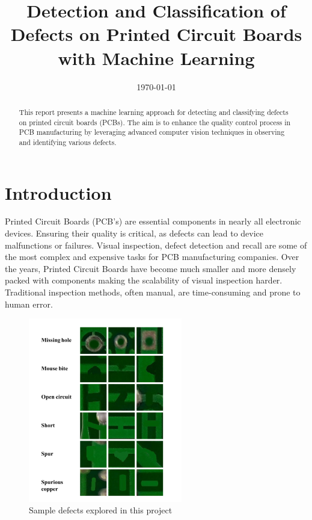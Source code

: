 \documentclass[12pt]{article}
\title{Detection and Classification of Defects on Printed Circuit Boards with Machine Learning\\\phantom{.}}
\date{\today}
\begin{document}
\thispagestyle{empty}
\maketitle
\thispagestyle{empty}

\tableofcontents
\thispagestyle{empty}

\clearpage
\newpage

\vspace{2.5cm}

\begin{abstract}
This report presents a machine learning approach for detecting and classifying defects on printed circuit boards (PCBs). The aim is to enhance the quality control process in PCB manufacturing by leveraging advanced computer vision techniques in observing and identifying various defects.  
\end{abstract}

\clearpage
\newpage

\section{Introduction}
Printed Circuit Boards (PCB's) are essential components in nearly all electronic devices. Ensuring their quality is critical, as defects can lead to device malfunctions or failures. Visual inspection, defect detection and recall are some of the most complex and expensive tasks for PCB manufacturing companies. Over the years, Printed Circuit Boards have become much smaller and more densely packed with components making the scalability of visual inspection harder. Traditional inspection methods, often manual, are time-consuming and prone to human error.

\begin{figure}[h]
    \centering
    \includegraphics[width=0.6\textwidth]{./graphics/Defects.png}
    \caption{Sample defects explored in this project}
    \label{fig:defects}
\end{figure}
\end{document}
